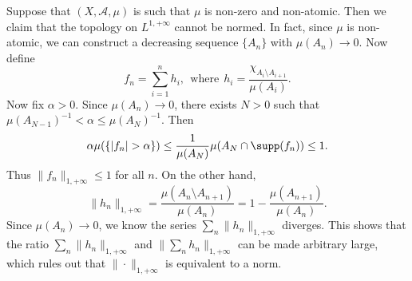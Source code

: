 \begin{example}
Suppose that $(X,\mathcal{A},\mu)$ is such that $\mu$ is non-zero and non-atomic. Then we claim that the topology on $L^{1,+\infty}$ cannot be normed. In fact, since $\mu$ is non-atomic, we can construct a decreasing sequence $\{A_n\}$ with $\mu(A_n)\to 0$. Now define
\[f_n=\sum_{i=1}^{n}h_i,\ \ \text{where}\ \ h_i=\frac{\chi_{A_i\setminus A_{i+1}}}{\mu(A_i)}.\]
Now fix $\alpha>0$. Since $\mu(A_n)\to 0$, there exists $N>0$ such that $\mu(A_{N-1})^{-1}<\alpha\leq\mu(A_{N})^{-1}$. Then
\[\alpha\mu(\{|f_n|>\alpha\})\leq\frac{1}{\mu(A_{N})}\mu(A_{N}\cap\supp(f_n))\leq 1.\]
Thus $\|f_n\|_{1,+\infty}\leq 1$ for all $n$. On the other hand,
\[\|h_n\|_{1,+\infty}=\frac{\mu(A_n\setminus A_{n+1})}{\mu(A_n)}=1-\frac{\mu(A_{n+1})}{\mu(A_n)}.\]
Since $\mu(A_n)\to 0$, we know the series $\sum_{n}\|h_n\|_{1,+\infty}$ diverges. This shows that the ratio $\sum_{n}\|h_n\|_{1,+\infty}$ and $\|\sum_nh_n\|_{1,+\infty}$ can be made arbitrary large, which rules out that $\|\cdot\|_{1,+\infty}$ is equivalent to a norm.
\end{example}
